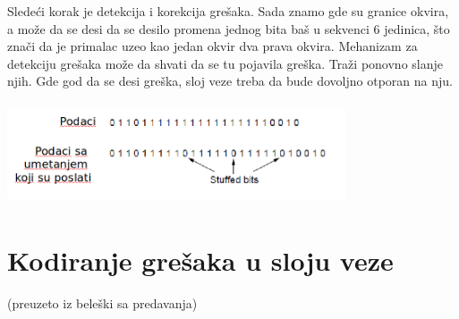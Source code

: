 \documentclass{article} %
\begin{document}
Sledeći korak je detekcija i korekcija grešaka. Sada znamo gde su granice okvira, a može da se desi da se desilo promena jednog bita baš u sekvenci 6 jedinica, što znači da je primalac uzeo kao jedan okvir dva prava okvira. Mehanizam za detekciju grešaka može da shvati da se tu pojavila greška. Traži ponovno slanje njih. Gde god da se desi greška, sloj veze treba da bude dovoljno otporan na nju.
\begin{center}
\includegraphics[width=10cm, height=3cm]{umetanjeBitova}\\
\end{center}
\section{Kodiranje grešaka u sloju veze}
(preuzeto iz beleški sa predavanja)\\
\end{document}
